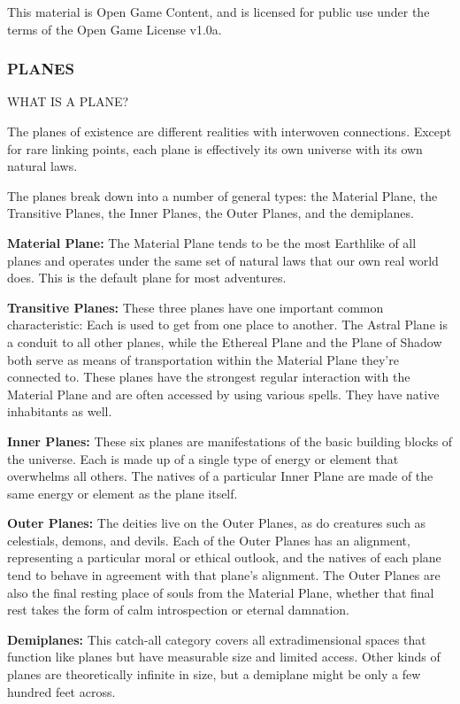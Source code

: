 \documentclass{article}
\begin{document}
This material is Open Game Content, and is licensed for public use under the terms 
of the Open Game License v1.0a.

\subsubsection*{{\LARGE{}PLANES}}

\vspace{12pt}
WHAT IS A PLANE?

The planes of existence are different realities with interwoven connections. Except 
for rare linking points, each plane is effectively its own universe with its own 
natural laws. 

The planes break down into a number of general types: the Material Plane, the Transitive 
Planes, the Inner Planes, the Outer Planes, and the demiplanes.

\textbf{Material Plane: }The Material Plane tends to be the most Earthlike of all 
planes and operates under the same set of natural laws that our own real world 
does. This is the default plane for most adventures.

\textbf{Transitive Planes:} These three planes have one important common characteristic: 
Each is used to get from one place to another. The Astral Plane is a conduit to 
all other planes, while the Ethereal Plane and the Plane of Shadow both serve as 
means of transportation within the Material Plane they're connected to. These planes 
have the strongest regular interaction with the Material Plane and are often accessed 
by using various spells. They have native inhabitants as well.

\textbf{Inner Planes:} These six planes are manifestations of the basic building 
blocks of the universe. Each is made up of a single type of energy or element that 
overwhelms all others. The natives of a particular Inner Plane are made of the 
same energy or element as the plane itself.

\textbf{Outer Planes:} The deities live on the Outer Planes, as do creatures such 
as celestials, demons, and devils. Each of the Outer Planes has an alignment, representing 
a particular moral or ethical outlook, and the natives of each plane tend to behave 
in agreement with that plane's alignment. The Outer Planes are also the final resting 
place of souls from the Material Plane, whether that final rest takes the form 
of calm introspection or eternal damnation.

\textbf{Demiplanes:} This catch-all category covers all extradimensional spaces 
that function like planes but have measurable size and limited access. Other kinds 
of planes are theoretically infinite in size, but a demiplane might be only a few 
hundred feet across.
\end{document}
